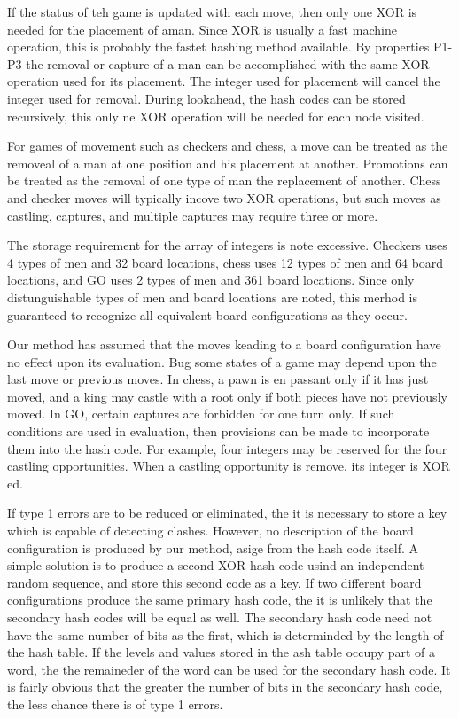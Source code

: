 \documentclass{article}
\begin{document}
If the status of teh game is updated with each move, then only one XOR is
needed for the placement of aman. Since XOR is usually a fast machine
operation, this is probably the fastet hashing method available. By properties
P1-P3 the removal or capture of a man can be accomplished with the same XOR
operation used for its placement. The integer used for placement will cancel
the integer used for removal. During lookahead, the hash codes can be stored
recursively, this only ne XOR operation will be needed for each node visited.

For games of movement such as checkers and chess, a move can be treated as the
removeal of a man at one position and his placement at another. Promotions can
be treated as the removal of one type of man the replacement of another. Chess
and checker moves will typically incove two XOR operations, but such moves as
castling, captures, and multiple captures may require three or more.

The storage requirement for the array of integers is note excessive. Checkers
uses 4 types of men and 32 board locations, chess uses 12 types of men and 64
board locations, and GO uses 2 types of men and 361 board locations. Since only
distunguishable types of men and board locations are noted, this merhod is
guaranteed to recognize all equivalent board configurations as they occur.

Our method has assumed that the moves keading to a board configuration have no
effect upon its evaluation. Bug some states of a game may depend upon the last
move or previous moves. In chess, a pawn is en passant only if it has just
moved, and a king may castle with a root only if both pieces have not
previously moved. In GO, certain captures are forbidden for one turn only. If
such conditions are used in evaluation, then provisions can be made to
incorporate them into the hash code. For example, four integers may be reserved
for the four castling opportunities. When a castling opportunity is remove, its
integer is XOR ed.

If type 1 errors are to be reduced or eliminated, the it is necessary to store
a key which is capable of detecting clashes. However, no description of the
board configuration is produced by our method, asige from the hash code itself.
A simple solution is to produce a second XOR hash code usind an independent
random sequence, and store this second code as a key. If two different board
configurations produce the same primary hash code, the it is unlikely that the
secondary hash codes will be equal as well. The secondary hash code need not
have the same number of bits as the first, which is determinded by the length
of the hash table. If the levels and values stored in the ash table occupy part
of a word, the the remaineder of the word can be used for the secondary hash
code. It is fairly obvious that the greater the number of bits in the secondary
hash code, the less chance there is of type 1 errors.
\end{document}
